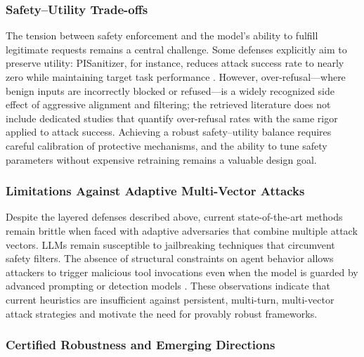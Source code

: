 \documentclass[11pt,a4paper]{article}
\begin{document}
\subsubsection{Safety--Utility Trade-offs}

The tension between safety enforcement and the model's ability to fulfill legitimate requests remains a central challenge. Some defenses explicitly aim to preserve utility: PISanitizer, for instance, reduces attack success rate to nearly zero while maintaining target task performance \cite{Geng_2025_LLMs_16cfd21e}. However, over-refusal---where benign inputs are incorrectly blocked or refused---is a widely recognized side effect of aggressive alignment and filtering; the retrieved literature does not include dedicated studies that quantify over-refusal rates with the same rigor applied to attack success. Achieving a robust safety--utility balance requires careful calibration of protective mechanisms, and the ability to tune safety parameters without expensive retraining remains a valuable design goal.

\subsubsection{Limitations Against Adaptive Multi-Vector Attacks}

Despite the layered defenses described above, current state-of-the-art methods remain brittle when faced with adaptive adversaries that combine multiple attack vectors. LLMs remain susceptible to jailbreaking techniques that circumvent safety filters. The absence of structural constraints on agent behavior allows attackers to trigger malicious tool invocations even when the model is guarded by advanced prompting or detection models \cite{Miculicich_2025_LLM_fdef6034}. These observations indicate that current heuristics are insufficient against persistent, multi-turn, multi-vector attack strategies and motivate the need for provably robust frameworks.

\subsubsection{Certified Robustness and Emerging Directions}
\end{document}
